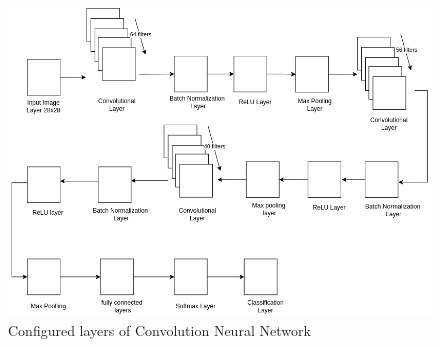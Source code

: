     \begin{figure}[h!]
        \centering
            \includegraphics[scale=0.45]{images/CNN_model.png}
            \caption{Configured layers of Convolution Neural Network}%
        \end{figure} 
    \newpage
\newpage
